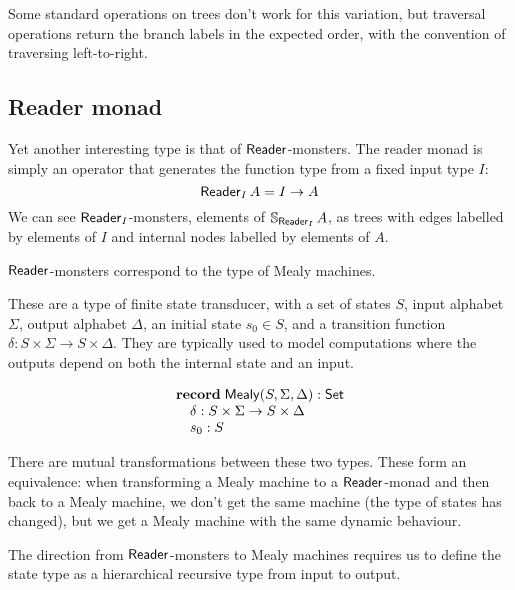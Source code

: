Some standard operations on trees don't work for this variation, but traversal operations return the branch labels in the expected order, with the convention of traversing left-to-right. 

\subsection{Reader monad}

Yet another interesting type is that of $\mathsf{Reader}$-monsters.
The reader monad is simply an operator that generates the function type from a fixed input type $I$:
$$
\mathsf{Reader}_I\,A = I \rightarrow A
$$
We can see $\mathsf{Reader}_I$-monsters, elements of $\mathbb{S}_{\mathsf{Reader}_I}\,A$, as trees with edges labelled by elements of $I$ and internal nodes labelled by elements of $A$.

$\mathsf{Reader}$-monsters correspond to the type of Mealy machines. 

These are a type of finite state transducer, with a set of states $S$, input alphabet $\Sigma$, output alphabet $\Delta$, an initial state $s_0 \in S$, and a transition function $\delta : S \times \Sigma \to S \times \Delta$. They are typically used to model computations where the outputs depend on both the internal state and an input.

$$
\begin{array}[t]{l}
\mathbf{record}\;
\mathsf{Mealy}(S,\Sigma,\Delta):\mathsf{Set}\\
\quad \delta : S \times \Sigma \to S \times \Delta \\
\quad s_0 : S
\end{array}
$$

There are mutual transformations between these two types.
These form an equivalence: when transforming a Mealy machine to a $\mathsf{Reader}$-monad and then back to a Mealy machine, we don't get the same machine (the type of states has changed), but we get a Mealy machine with the same dynamic behaviour.

The direction from $\mathsf{Reader}$-monsters to Mealy machines requires us to define the state type as a hierarchical recursive type from input to output.



